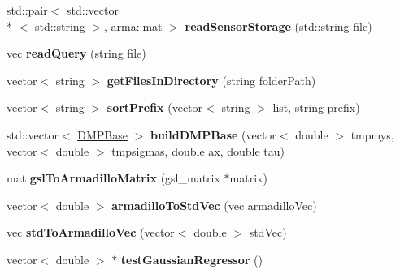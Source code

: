 \begin{DoxyCompactItemize}
\item 
\hypertarget{namespacekukadu_af705f555ddead7ff7b1bb9dd937adff1}{std\-::pair$<$ std\-::vector\\*
$<$ std\-::string $>$, arma\-::mat $>$ {\bfseries read\-Sensor\-Storage} (std\-::string file)}\label{namespacekukadu_af705f555ddead7ff7b1bb9dd937adff1}

\item 
\hypertarget{namespacekukadu_ac3b7339c98a02ebbacff3272fd3aa6e0}{vec {\bfseries read\-Query} (string file)}\label{namespacekukadu_ac3b7339c98a02ebbacff3272fd3aa6e0}

\item 
\hypertarget{namespacekukadu_a8967b22ed1eec57bc76b687a63ab4a03}{vector$<$ string $>$ {\bfseries get\-Files\-In\-Directory} (string folder\-Path)}\label{namespacekukadu_a8967b22ed1eec57bc76b687a63ab4a03}

\item 
\hypertarget{namespacekukadu_a6c32f5b1575bda3fba2fb6aa361e6f71}{vector$<$ string $>$ {\bfseries sort\-Prefix} (vector$<$ string $>$ list, string prefix)}\label{namespacekukadu_a6c32f5b1575bda3fba2fb6aa361e6f71}

\item 
\hypertarget{namespacekukadu_a383a9d72755140f9dcf797a99e9eb77d}{std\-::vector$<$ \hyperlink{classkukadu_1_1DMPBase}{D\-M\-P\-Base} $>$ {\bfseries build\-D\-M\-P\-Base} (vector$<$ double $>$ tmpmys, vector$<$ double $>$ tmpsigmas, double ax, double tau)}\label{namespacekukadu_a383a9d72755140f9dcf797a99e9eb77d}

\item 
\hypertarget{namespacekukadu_affb25d35d5eef5bc7d803a94c0e66739}{mat {\bfseries gsl\-To\-Armadillo\-Matrix} (gsl\-\_\-matrix $\ast$matrix)}\label{namespacekukadu_affb25d35d5eef5bc7d803a94c0e66739}

\item 
\hypertarget{namespacekukadu_aa526722c4b4af0fe1798ec3dc80c8ce5}{vector$<$ double $>$ {\bfseries armadillo\-To\-Std\-Vec} (vec armadillo\-Vec)}\label{namespacekukadu_aa526722c4b4af0fe1798ec3dc80c8ce5}

\item 
\hypertarget{namespacekukadu_aa810194d5e61a8bfbf3d3b1e4aa405ef}{vec {\bfseries std\-To\-Armadillo\-Vec} (vector$<$ double $>$ std\-Vec)}\label{namespacekukadu_aa810194d5e61a8bfbf3d3b1e4aa405ef}

\item 
\hypertarget{namespacekukadu_affc5bcde345f3ad613e5546d02a167c4}{vector$<$ double $>$ $\ast$ {\bfseries test\-Gaussian\-Regressor} ()}\label{namespacekukadu_affc5bcde345f3ad613e5546d02a167c4}


\end{DoxyCompactItemize}
